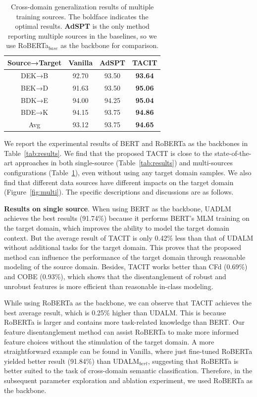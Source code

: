 \documentclass[letterpaper]{article} %
\begin{document}
\begin{table}[htbp]
	\centering
	\setlength\tabcolsep{3.3mm}
	\renewcommand{\arraystretch}{0.5}
	\begin{tabular}{cccc}
		\hline  \hline
		Source→Target & Vanilla & AdSPT & TACIT \\ \hline
		DEK→B & 92.70 & 93.50  & \textbf{93.64} \\
		BEK→D & 91.63 & 93.50  & \textbf{95.06} \\
		BDK→E & 94.00 & 94.25 & \textbf{95.04} \\
		BDE→K & 94.15 & 93.75 & \textbf{94.86} \\  \hline
		Avg   & 93.12 & 93.75 & \textbf{94.65} \\ \hline \hline
	\end{tabular}%
	\caption{Cross-domain generalization results of multiple training sources. The boldface indicates the optimal results. \textbf{AdSPT} is the only method reporting multiple sources in the baselines, so we use RoBERTa$_{base}$ as the backbone for comparison.}
	\label{tab:multi-source}%
\end{table}%

We report the experimental results of BERT and RoBERTa as the backbones in Table~\ref{tab:results}. We find that the proposed TACIT is close to the state-of-the-art approaches in both single-source (Table~\ref{tab:results}) and multi-sources configurations (Table~\ref{tab:multi-source}), even without using any target domain samples. We also find that different data sources have different impacts on the target domain (Figure~\ref{fig:multi}). The specific descriptions and discussions are as follows.

\textbf{Results on single source}. When using BERT as the backbone, UADLM achieves the best results (91.74\%) because it performs BERT's MLM training on the target domain, which improves the ability to model the target domain context. But the average result of TACIT is only 0.42\% less than that of UDALM without additional tasks for the target domain. This proves that the proposed method can influence the performance of the target domain through reasonable modeling of the source domain. Besides, TACIT works better than CFd (0.69\%) and COBE (0.93\%), which shows that the disentanglement of robust and unrobust features is more efficient than reasonable in-class modeling.

While using RoBERTa as the backbone, we can observe that TACIT achieves the best average result, which is 0.25\% higher than UDALM. This is because RoBERTa is larger and contains more task-related knowledge than BERT. Our feature disentanglement method can assist RoBERTa to make more informed feature choices without the stimulation of the target domain. A more straightforward example can be found in Vanilla, where just fine-tuned RoBERTa yielded better result (91.84\%) than UDALM$_{bert}$, suggesting that RoBERTa is better suited to the task of cross-domain semantic classification. Therefore, in the subsequent parameter exploration and ablation experiment, we used RoBERTa as the backbone. 
\end{document}
